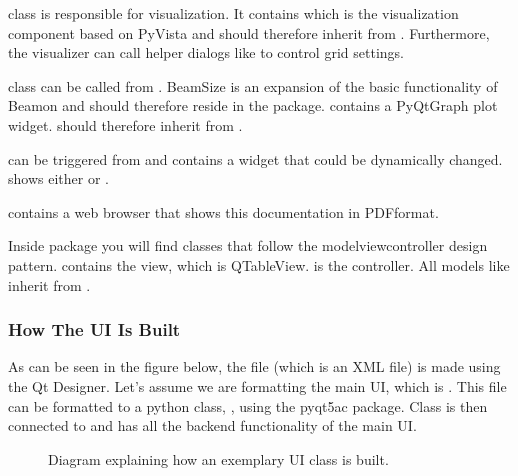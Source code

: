 \documentclass[letterpaper,10pt,english]{sphinxmanual}
\begin{document}
 class is responsible for visualization. It contains  which is the visualization
component based on PyVista and should therefore inherit from .
Furthermore, the visualizer can call helper dialogs like  to control grid settings.

 class can be called from . BeamSize is an expansion of the basic functionality of Beamon and
should therefore reside in the  package.  contains a PyQtGraph plot widget. 
should therefore inherit from .

 can be triggered from  and contains a widget that could be dynamically changed. 
shows either  or .

 contains a web browser that shows this documentation in PDF\sphinxhyphen{}format.

Inside  package you will find classes that follow the model\sphinxhyphen{}view\sphinxhyphen{}controller design pattern. 
contains the view, which is QTableView.  is the controller. All models like  inherit
from .


\subsubsection{How The UI Is Built}
\label{\detokenize{implementation:how-the-ui-is-built}}
As can be seen in the figure below, the  file (which is an XML file) is made using the Qt Designer.
Let’s assume we are formatting the main UI, which is .
This file can be formatted to a python class, , using the pyqt5ac package. Class  is
then connected to  and has all the backend functionality of the main UI.

\begin{figure}[htbp]
\centering
\capstart

\noindent{}
\caption{Diagram explaining how an exemplary UI class is built.}\label{\detokenize{implementation:id4}}\end{figure}
\end{document}
